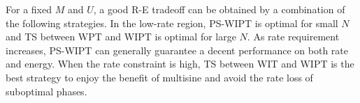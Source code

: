 For a fixed $M$ and $U$, a good R-E tradeoff can be obtained by a combination of the following strategies. In the low-rate region, PS-WIPT is optimal for small $N$ and TS between WPT and WIPT is optimal for large $N$. As rate requirement increases, PS-WIPT can generally guarantee a decent performance on both rate and energy. When the rate constraint is high, TS between WIT and WIPT is the best strategy to enjoy the benefit of multisine and avoid the rate loss of suboptimal phases. 